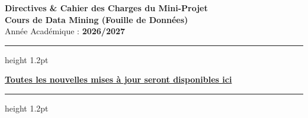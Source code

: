 \documentclass[11pt,a4paper]{article}
\begin{document}
\begin{tcolorbox}[colback=sintefblue, colframe=sintefblue, arc=3mm, halign=center, colupper=white]
    \vspace{0.2cm}
    {\Huge \bfseries Directives \& Cahier des Charges du Mini-Projet}\\[0.3cm]
    {\Large \bfseries Cours de Data Mining (Fouille de Données)}\\[0.2cm]
    {\large Année Académique : \textbf{2026/2027}}
    \vspace{0.2cm}
\end{tcolorbox}

\vspace{0.3cm}

\hrule height 1.2pt
\vspace{0.2cm}
\begin{center}
    \color{sintefblue} \textbf{\large \href{https://hosniadilemp-a11y.github.io/DataMiningProjectPage/}{Toutes les nouvelles mises à jour seront disponibles ici}}
\end{center}
\vspace{0.2cm}
\hrule height 1.2pt

\vspace{0.4cm}
\end{document}
